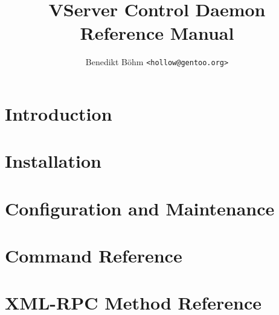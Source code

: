 \documentclass[a4paper,10pt,oneside]{scrbook}
\title{VServer Control Daemon\\Reference Manual}
\author{Benedikt Böhm \texttt{<hollow@gentoo.org>}}
\begin{document}
\maketitle

\frontmatter
\setcounter{tocdepth}{1}
\tableofcontents


\mainmatter
\part{Introduction}
\label{pt:intro}




\part{Installation}
\label{pt:install}

\part{Configuration and Maintenance}
\label{pt:config}

\part{Command Reference}
\label{pt:cmdref}






\part{XML-RPC Method Reference}
\label{pt:rpcref}







\backmatter

\end{document}
